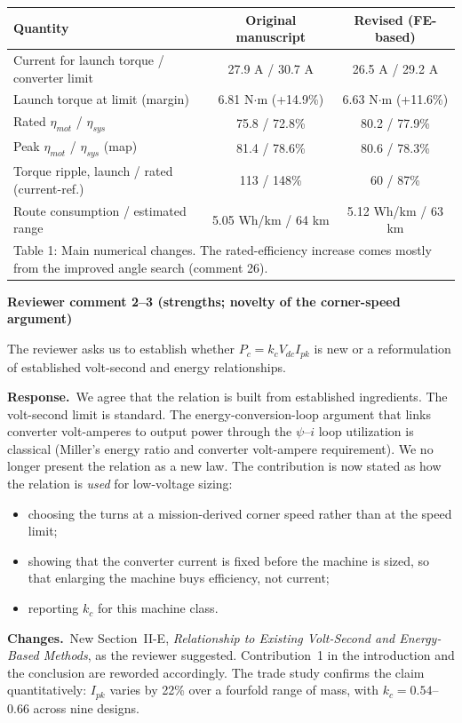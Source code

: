 \documentclass[10pt]{article}
\newcommand{\rev}[1]{\par\medskip\noindent\textbf{Reviewer comment #1}\par}
\newcommand{\resp}{\par\noindent\textcolor{blue!50!black}{\textbf{Response.}}~}
\newcommand{\chg}{\par\noindent\textcolor{green!35!black}{\textbf{Changes.}}~}
\begin{document}
\begin{center}
\small
\begin{tabular}{lcc}
\hline
Quantity & Original manuscript & Revised (FE-based)\\
\hline
Current for launch torque / converter limit & 27.9 A / 30.7 A & 26.5 A / 29.2 A\\
Launch torque at limit (margin) & 6.81 N$\cdot$m (+14.9\%) & 6.63 N$\cdot$m (+11.6\%)\\
Rated $\eta_{mot}$ / $\eta_{sys}$ & 75.8 / 72.8\% & 80.2 / 77.9\%\\
Peak $\eta_{mot}$ / $\eta_{sys}$ (map) & 81.4 / 78.6\% & 80.6 / 78.3\%\\
Torque ripple, launch / rated (current-ref.) & 113 / 148\% & 60 / 87\%\\
Route consumption / estimated range & 5.05 Wh/km / 64 km & 5.12 Wh/km / 63 km\\
\hline
\multicolumn{3}{l}{\footnotesize Table 1: Main numerical changes. The rated-efficiency increase comes mostly from the improved angle search (comment 26).}
\end{tabular}
\end{center}

\rev{2--3 (strengths; novelty of the corner-speed argument)}
The reviewer asks us to establish whether $P_c=k_cV_{dc}I_{pk}$ is new or a
reformulation of established volt-second and energy relationships.
\resp We agree that the relation is built from established ingredients. The
volt-second limit is standard. The energy-conversion-loop argument that links
converter volt-amperes to output power through the $\psi$--$i$ loop
utilization is classical (Miller's energy ratio and converter volt-ampere
requirement). We no longer present the relation as a new law. The
contribution is now stated as how the relation is \emph{used} for low-voltage
sizing:
\begin{itemize}[nosep]
\item choosing the turns at a mission-derived corner speed rather than at the
speed limit;
\item showing that the converter current is fixed before the machine is sized,
so that enlarging the machine buys efficiency, not current;
\item reporting $k_c$ for this machine class.
\end{itemize}
\chg New Section~II-E, \emph{Relationship to Existing Volt-Second and
Energy-Based Methods}, as the reviewer suggested. Contribution~1 in the
introduction and the conclusion are reworded accordingly. The trade study
confirms the claim quantitatively: $I_{pk}$ varies by 22\% over a fourfold
range of mass, with $k_c=0.54$--$0.66$ across nine designs.
\end{document}
